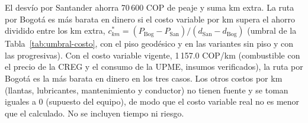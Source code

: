 El desvío por Santander ahorra 70\,600 COP de peaje y suma km extra. La ruta por Bogotá es más barata en dinero si el costo variable por km supera el ahorro dividido entre los km extra, $c_{km}^{*} = (P_{\mathrm{Bog}} - P_{\mathrm{San}}) / (d_{\mathrm{San}} - d_{\mathrm{Bog}})$ (umbral de la Tabla~\ref{tab:umbral-costo}, con el piso geodésico y en las variantes sin piso y con las progresivas). Con el costo variable vigente, 1\,157.0 COP/km (combustible con el precio de la CREG y el consumo de la UPME, insumos verificados), la ruta por Bogotá es la más barata en dinero en los tres casos. Los otros costos por km (llantas, lubricantes, mantenimiento y conductor) no tienen fuente y se toman iguales a 0 (supuesto del equipo), de modo que el costo variable real no es menor que el calculado. No se incluyen tiempo ni riesgo.
